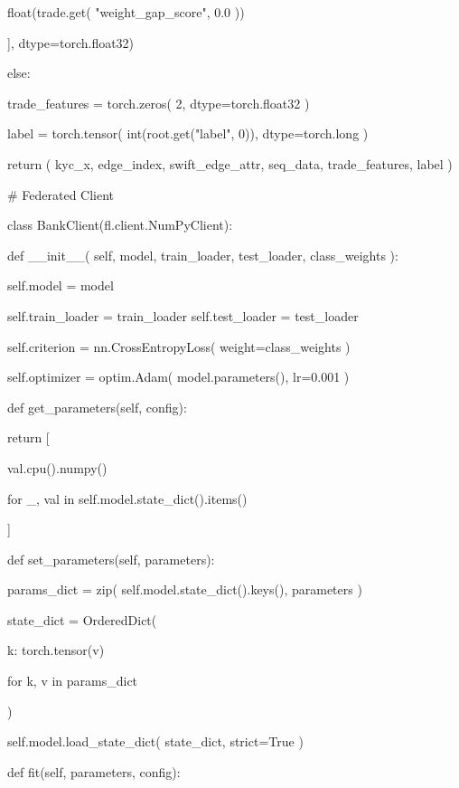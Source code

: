 \begin{tcblisting}
                float(trade.get(
                    "weight_gap_score", 0.0
                ))

            ], dtype=torch.float32)

        else:

            trade_features = torch.zeros(
                2,
                dtype=torch.float32
            )

        label = torch.tensor(
            int(root.get("label", 0)),
            dtype=torch.long
        )

        return (
            kyc_x,
            edge_index,
            swift_edge_attr,
            seq_data,
            trade_features,
            label
        )

# Federated Client

class BankClient(fl.client.NumPyClient):

    def __init__(
        self,
        model,
        train_loader,
        test_loader,
        class_weights
    ):

        self.model = model

        self.train_loader = train_loader
        self.test_loader = test_loader

        self.criterion = nn.CrossEntropyLoss(
            weight=class_weights
        )

        self.optimizer = optim.Adam(
            model.parameters(),
            lr=0.001
        )

    def get_parameters(self, config):

        return [

            val.cpu().numpy()

            for _, val in
            self.model.state_dict().items()

        ]

    def set_parameters(self, parameters):

        params_dict = zip(
            self.model.state_dict().keys(),
            parameters
        )

        state_dict = OrderedDict({

            k: torch.tensor(v)

            for k, v in params_dict

        })

        self.model.load_state_dict(
            state_dict,
            strict=True
        )

    def fit(self, parameters, config):


\end{tcblisting}
